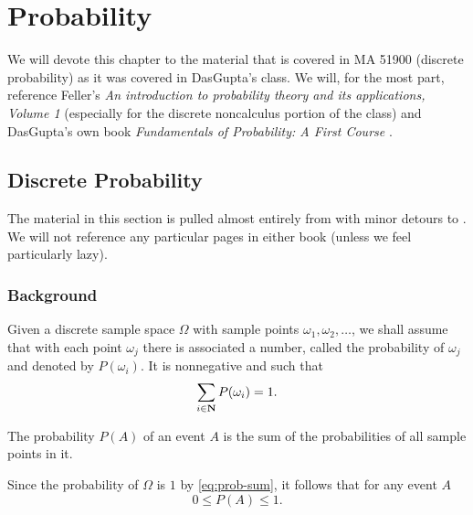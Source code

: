 \chapter{Probability}
We will devote this chapter to the material that is covered in MA 51900
(discrete probability) as it was covered in DasGupta's class. We will, for
the most part, reference Feller's \emph{An introduction to probability
  theory and its applications, Volume 1} \cite{feller} (especially for the
discrete noncalculus portion of the class) and DasGupta's own book
\emph{Fundamentals of Probability: A First Course} \cite{dasgupta}.

\section{Discrete Probability}
The material in this section is pulled almost entirely from \cite{feller}
with minor detours to \cite{dasgupta}. We will not reference any particular
pages in either book (unless we feel particularly lazy).

\subsection{Background}
Given a discrete sample space \(\Omega\) with sample points
\(\omega_1,\omega_2,\dotsc\), we shall assume that with each point
\(\omega_j\) there is associated a number, called the probability of
\(\omega_j\) and denoted by \(P(\omega_i)\). It is nonnegative and such
that
\begin{equation}
  \label{eq:prob-sum}
  \sum_{i\in\mathbf{N}} P(\omega_i)=1.
\end{equation}

\begin{definition}
  The probability \(P(A)\) of an event \(A\) is the sum of the
  probabilities of all sample points in it.
\end{definition}

Since the probability of \(\Omega\) is \(1\) by \eqref{eq:prob-sum}, it
follows that for any event \(A\)
\begin{equation}
  \label{eq:prob-event}
  0\leq P(A)\leq 1.
\end{equation}

